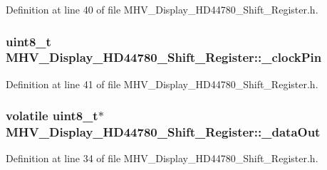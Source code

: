 \-Definition at line 40 of file \-M\-H\-V\-\_\-\-Display\-\_\-\-H\-D44780\-\_\-\-Shift\-\_\-\-Register.\-h.

\hypertarget{class_m_h_v___display___h_d44780___shift___register_a166569c75b144383a553a35a10a60221}{
\subsubsection[{\-\_\-clock\-Pin}]{\setlength{\rightskip}{0pt plus 5cm}uint8\-\_\-t {\bf \-M\-H\-V\-\_\-\-Display\-\_\-\-H\-D44780\-\_\-\-Shift\-\_\-\-Register\-::\-\_\-clock\-Pin}}}
\label{class_m_h_v___display___h_d44780___shift___register_a166569c75b144383a553a35a10a60221}


\-Definition at line 41 of file \-M\-H\-V\-\_\-\-Display\-\_\-\-H\-D44780\-\_\-\-Shift\-\_\-\-Register.\-h.

\hypertarget{class_m_h_v___display___h_d44780___shift___register_a1ef9590349f13740a07da6cde46f7501}{
\subsubsection[{\-\_\-data\-Out}]{\setlength{\rightskip}{0pt plus 5cm}volatile uint8\-\_\-t$\ast$ {\bf \-M\-H\-V\-\_\-\-Display\-\_\-\-H\-D44780\-\_\-\-Shift\-\_\-\-Register\-::\-\_\-data\-Out}}}
\label{class_m_h_v___display___h_d44780___shift___register_a1ef9590349f13740a07da6cde46f7501}


\-Definition at line 34 of file \-M\-H\-V\-\_\-\-Display\-\_\-\-H\-D44780\-\_\-\-Shift\-\_\-\-Register.\-h.


